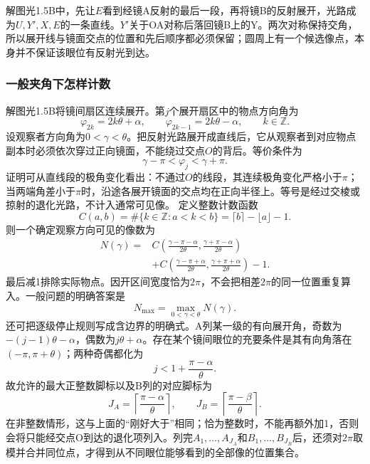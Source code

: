 \documentclass[UTF8,fontset=fandol,a4paper,11pt]{ctexart}
\begin{document}
解图光1.5B中，先让$E$看到经镜A反射的最后一段，再将镜B的反射展开，光路成为$U,Y',X,E$的一条直线。$Y'$关于OA对称后落回镜B上的Y。两次对称保持交角，所以展开线与镜面交点的位置和先后顺序都必须保留；圆周上有一个候选像点，本身并不保证该眼位有反射光到达。

\subsubsection*{一般夹角下怎样计数}
解图光1.5B将镜间扇区连续展开。第$j$个展开扇区中的物点方向角为
\[
\varphi_{2k}=2k\theta+\alpha,\qquad
\varphi_{2k-1}=2k\theta-\alpha,\qquad k\in\mathbb Z.
\]
设观察者方向角为$0<\gamma<\theta$。把反射光路展开成直线后，它从观察者到对应物点副本时必须依次穿过正向镜面，不能绕过交点$O$的背后。等价条件为
\[
\gamma-\pi<\varphi_j<\gamma+\pi.
\]
证明可从直线段的极角变化看出：不通过$O$的线段，其连续极角变化严格小于$\pi$；当两端角差小于$\pi$时，沿途各展开镜面的交点均在正向半径上。等号是经过交棱或掠射的退化光路，不计入通常可见像。
定义整数计数函数
\[
C(a,b)=\#\{k\in\mathbb Z:a<k<b\}
=\lceil b\rceil-\lfloor a\rfloor-1.
\]
则一个确定观察方向可见的像数为
\[
\begin{split}
N(\gamma)={}&
C\!\left(\frac{\gamma-\pi-\alpha}{2\theta},
         \frac{\gamma+\pi-\alpha}{2\theta}\right)\\
&+C\!\left(\frac{\gamma-\pi+\alpha}{2\theta},
          \frac{\gamma+\pi+\alpha}{2\theta}\right)-1.
\end{split}
\]
最后减1排除实际物点。因开区间宽度恰为$2\pi$，不会把相差$2\pi$的同一位置重复算入。一般问题的明确答案是
\[
\boxed{N_{\max}=\max_{0<\gamma<\theta}N(\gamma)}.
\]
还可把逐级停止规则写成含边界的明确式。A列某一级的有向展开角，奇数为$-(j-1)\theta-\alpha$，偶数为$j\theta+\alpha$。存在某个镜间眼位的充要条件是其有向角落在$(-\pi,\pi+\theta)$；两种奇偶都化为
\[
j<1+\frac{\pi-\alpha}{\theta}.
\]
故允许的最大正整数脚标以及B列的对应脚标为
\[
J_A=\left\lceil\frac{\pi-\alpha}{\theta}\right\rceil,\qquad
J_B=\left\lceil\frac{\pi-\beta}{\theta}\right\rceil.
\]
在非整数情形，这与上面的“刚好大于”相同；恰为整数时，不能再额外加1，否则会将只能经交点O到达的退化项列入。列完$A_1,\ldots,A_{J_A}$和$B_1,\ldots,B_{J_B}$后，还须对$2\pi$取模并合并同位点，才得到从不同眼位能够看到的全部像的位置集合。
\end{document}
